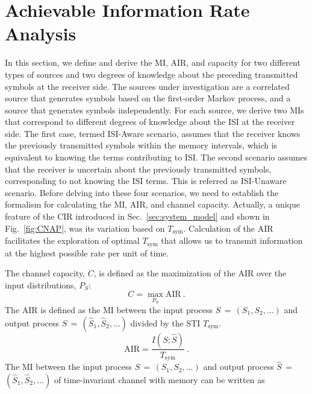 \documentclass[journal]{IEEEtranTCOM}
\begin{document}
\section{Achievable Information Rate Analysis} \label{sec:capacity}
\par In this section, we define and derive the MI, AIR, and capacity for two different types of sources and two degrees of knowledge about the preceding transmitted symbols at the receiver side. The sources under investigation are a correlated source that generates symbols based on the first-order Markov process, and a source that generates symbols independently. For each source, we derive two MIs that correspond to different degrees of knowledge about the ISI at the receiver side. The first case, termed ISI-Aware scenario, assumes that the receiver knows the previously transmitted symbols within the memory intervals, which is equivalent to knowing the terms contributing to ISI. The second scenario assumes that the receiver is uncertain about the previously transmitted symbols, corresponding to not knowing the ISI terms. This is referred as ISI-Unaware scenario. Before delving into these four scenarios, we need to establish the formalism for calculating the MI, AIR, and channel capacity. Actually, a unique feature of the CIR introduced in Sec.~\ref{sec:system_model} and shown in Fig.~\ref{fig:CNAP}, was its variation based on $T_{\mathrm{sym}}$. Calculation of the AIR facilitates the exploration of optimal $T_{\mathrm{sym}}$ that allows us to transmit information at the highest possible rate per unit of time.
\par The channel capacity, $C$,  is defined as the maximization of the AIR over the input distributions, $P_{S}$: 
\begin{equation}
    C = \max_{P_{S}}\text{AIR}~.\label{eq:capacity}
\end{equation}
The AIR is defined as the MI between the input process $S$$\,=\,$$(S_{1},S_{2},\ldots)$ and output process $\hat{S}$$\,=\,$$(\hat{S}_{1},\hat{S}_2,\ldots)$ divided by the STI $T_{\mathrm{sym}}$. 
\begin{equation}
    \text{AIR}=\frac{I(S;\hat{S})}{T_{\mathrm{sym}}}~.
\end{equation}
The MI between the input process $S$$\,=\,$$(S_{1},S_{2},\ldots)$ and output process $\hat{S}$$\,=\,$$(\hat{S}_{1},\hat{S}_2,\ldots)$ of time-invariant channel with memory can be written as~\cite{arnold2003simulation}
\end{document}
